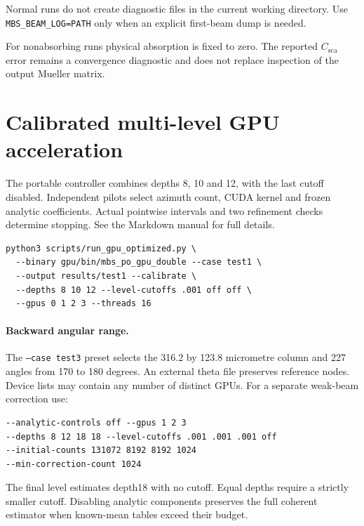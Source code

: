 \documentclass[
  10pt,
  a4paper,
]{article}
\begin{document}
Normal runs do not create diagnostic files in the current working directory.
Use \texttt{MBS\_BEAM\_LOG=PATH} only when an explicit first-beam dump is
needed.

For nonabsorbing runs physical absorption is fixed to zero. The reported
$C_{\mathrm{sca}}$ error remains a convergence diagnostic and does not replace
inspection of the output Mueller matrix.


\section{Calibrated multi-level GPU acceleration}
The portable controller combines depths 8, 10 and 12, with the last cutoff disabled. Independent pilots select azimuth count, CUDA kernel and frozen analytic coefficients. Actual pointwise intervals and two refinement checks determine stopping. See the Markdown manual for full details.
\begin{verbatim}
python3 scripts/run_gpu_optimized.py \
  --binary gpu/bin/mbs_po_gpu_double --case test1 \
  --output results/test1 --calibrate \
  --depths 8 10 12 --level-cutoffs .001 off off \
  --gpus 0 1 2 3 --threads 16
\end{verbatim}
\paragraph{Backward angular range.}
The \texttt{--case test3} preset selects the 316.2 by 123.8 micrometre column
and 227 angles from 170 to 180 degrees. An external theta file preserves
reference nodes. Device lists may contain any number of distinct GPUs.
For a separate weak-beam correction use:
\begin{verbatim}
--analytic-controls off --gpus 1 2 3
--depths 8 12 18 18 --level-cutoffs .001 .001 .001 off
--initial-counts 131072 8192 8192 1024
--min-correction-count 1024
\end{verbatim}
The final level estimates depth18 with no cutoff. Equal depths require a
strictly smaller cutoff. Disabling analytic components preserves the full
coherent estimator when known-mean tables exceed their budget.
\end{document}

